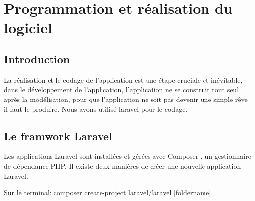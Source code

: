  \chapter{Programmation et réalisation du logiciel}
\minitoc
\newpage
\section{Introduction}
	  La réalisation et le codage de l'application est une étape cruciale et inévitable,  dans le développement de l'application, l'application ne se construit tout seul après la modélisation, pour que l'application ne soit pas devenir une simple rêve il faut le produire.
	  \medskip
	  Nous avons utilisé laravel pour le codage.
	  
	  
	  \section{Le framwork Laravel}
	  
	  Les applications Laravel sont installées et gérées avec Composer , un gestionnaire de
	  dépendance PHP. Il existe deux manières de créer une nouvelle application Laravel.
	  
	 Sur le terminal:
	  composer create-project laravel/laravel [foldername]